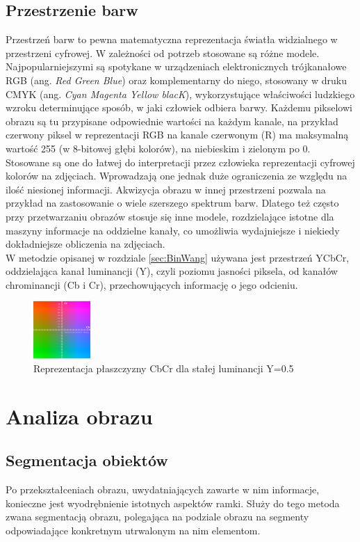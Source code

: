 \subsection{Przestrzenie barw}
Przestrzeń barw to pewna matematyczna reprezentacja światła widzialnego w przestrzeni cyfrowej. W zależności od potrzeb stosowane są różne modele. Najpopularniejszymi są spotykane w urządzeniach elektronicznych trójkanałowe RGB (ang. \textit{Red Green Blue}) oraz komplementarny do niego, stosowany w druku CMYK (ang. \textit{Cyan Magenta Yellow blacK}), wykorzystujące właściwości ludzkiego wzroku determinujące sposób, w jaki człowiek odbiera barwy. Każdemu pikselowi obrazu są tu przypisane odpowiednie wartości na każdym kanale, na przykład czerwony piksel w reprezentacji RGB na kanale czerwonym (R) ma maksymalną wartość 255 (w 8-bitowej głębi kolorów), na niebieskim i zielonym po 0. Stosowane są one do łatwej do interpretacji przez człowieka reprezentacji cyfrowej kolorów na zdjęciach. Wprowadzają one jednak duże ograniczenia ze względu na ilość niesionej informacji. Akwizycja obrazu w innej przestrzeni pozwala na przykład na zastosowanie o wiele szerszego spektrum barw. Dlatego też często przy przetwarzaniu obrazów stosuje się inne modele, rozdzielające istotne dla maszyny informacje na oddzielne kanały, co umożliwia wydajniejsze i niekiedy dokładniejsze obliczenia na zdjęciach. \\
W metodzie opisanej w rozdziale \ref{sec:BinWang}  używana jest przestrzeń YCbCr, oddzielająca kanał luminancji (Y), czyli poziomu jasności piksela, od kanałów chrominancji (Cb i Cr), przechowujących informację o jego odcieniu.
\begin{figure}[!htb]
\centering
\includegraphics[width=82px]{img/YCbCr}
\caption{Reprezentacja płaszczyzny 
CbCr dla stałej luminancji Y=0.5}
\end{figure}
\section{Analiza obrazu} 
\subsection{Segmentacja obiektów}
Po przekształceniach obrazu, uwydatniających zawarte w nim informacje, konieczne jest wyodrębnienie istotnych aspektów ramki. Służy do tego metoda zwana segmentacją obrazu, polegająca na podziale obrazu na segmenty odpowiadające konkretnym utrwalonym na nim elementom.
